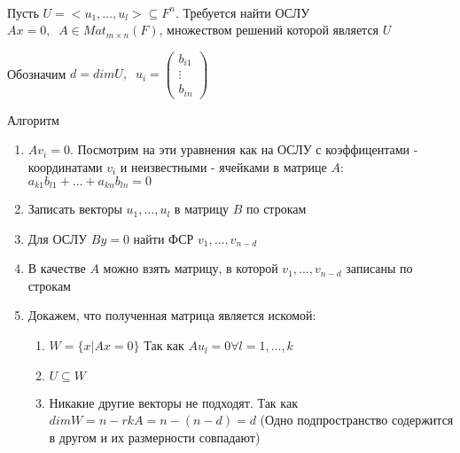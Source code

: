 \begin{problem}~

    Пусть $U = <u_1, \dots, u_l> \subseteq F^n$. Требуется найти ОСЛУ $Ax = 0, \;\; A \in Mat_{m \times n}(F)$, множеством решений которой является $U$

    Обозначим $d = dim U, \;\; u_i = \begin{pmatrix}
        b_{i1} \\ \vdots \\ b_{in}
    \end{pmatrix}$

    \begin{lemma} Алгоритм
        
        \begin{enumerate}
            \item $Av_i = 0$. Посмотрим на эти уравнения как на ОСЛУ с коэффицентами - координатами $v_i$ и неизвестными - ячейками в матрице $A$: $a_{k1}b_{l1} + \dots + a_{kn}b_{ln} = 0$
            \item Записать векторы $u_1, \dots, u_l$ в матрицу $B$ по строкам
            \item Для ОСЛУ $By = 0$ найти ФСР $v_1, \dots, v_{n - d}$
            \item В качестве $A$ можно взять матрицу, в которой $v_1, \dots, v_{n - d}$ записаны по строкам
            \item Докажем, что полученная матрица является искомой: \begin{enumerate}
                \item $W = \{x | Ax = 0\}$ Так как $Au_l = 0 \forall l = 1, \dots, k$
                \item $U \subseteq W$
                \item Никакие другие векторы не подходят. Так как $dim W = n - rk A = n - (n - d) = d$ (Одно подпространство содержится в другом и их размерности совпадают)
            \end{enumerate}
        \end{enumerate}

    \end{lemma}

\end{problem}


\bigskip


